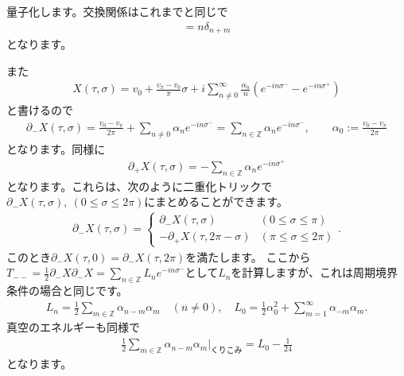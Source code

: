 \documentclass[report,paper=a4, fontsize=12pt, line_length=16cm, number_of_lines=34,dvipdfmx]{jlreq}
\numberwithin{equation}{chapter}
\numberwithin{equation}{section}
\newcommand{\Zb}{\mathbb{Z}}
\newcommand{\del}{\partial}
\begin{document}
量子化します。交換関係はこれまでと同じで
\begin{align}
  [\alpha_n,\alpha_m]=n\delta_{n+m}
\end{align}
となります。

また
\begin{align}
  X(\tau,\sigma)=v_{0}+\frac{v_{\pi}-v_{0}}{\pi}\sigma+i\sum_{n\ne 0}^{\infty}\frac{\alpha_{n}}{n}\left( e^{-in\sigma^{-}}-e^{-in\sigma^{+}} \right)
\end{align}
と書けるので
\begin{align}
  \del_{-}X(\tau,\sigma)=\frac{v_{0}-v_{\pi}}{2\pi}+\sum_{n\ne 0}\alpha_{n}e^{-in\sigma^{-}}=\sum_{n\in \Zb}\alpha_{n}e^{-in\sigma^{-}},\qquad \alpha_{0}:=\frac{v_{0}-v_{\pi}}{2\pi}
  \label{DDmodeexp}
\end{align}
となります。同様に
\begin{align}
  \del_{+}X(\tau,\sigma)=-\sum_{n\in \Zb}\alpha_{n}e^{-in\sigma^{+}}
\end{align}
となります。これらは、次のように二重化トリックで$\del_{-}X(\tau,\sigma),\ (0\le \sigma \le 2\pi)$にまとめることができます。
\begin{align}
  \del_{-}X(\tau,\sigma)=
  \begin{cases}
    \del_{-}X(\tau,\sigma)& (0\le \sigma \le \pi)\\
    -\del_{+}X(\tau,2\pi-\sigma) & (\pi\le \sigma \le 2\pi)
  \end{cases}.
\end{align}
このとき$\del_{-}X(\tau,0)=\del_{-}X(\tau,2\pi)$を満たします。
ここから$T_{--}=\frac12\del_{-}X\del_{-}X=\sum_{n\in \Zb}L_{n}e^{-in\sigma^{-}}$として$L_n$を計算しますが、これは周期境界条件の場合と同じです。
\begin{align}
  L_{n}=\frac12 \sum_{m\in\Zb}\alpha_{n-m}\alpha_{m}\quad (n\ne 0),\quad
  L_{0}=\frac12 \alpha_{0}^2+\sum_{m=1}^{\infty}\alpha_{-m}\alpha_{m}.
\end{align}
真空のエネルギーも同様で
\begin{align}
  \frac12 \sum_{m\in\Zb}\alpha_{n-m}\alpha_{m}\Bigg|_{\text{くりこみ}}=L_0-\frac{1}{24}
\end{align}
となります。
\end{document}
